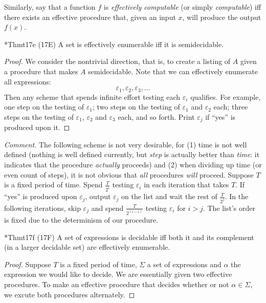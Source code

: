 Similarly, say that a function $f$ is \textit{effectively computable} (or simply \textit{computable}) iff there exists an effective procedure that, given an input $x$, will produce the output $f(x)$.

\begin{reference}{*Thm}{t17e}
  (17E) A set is effectively enumerable iff it is semidecidable.
\end{reference}

\begin{proof}
  We consider the nontrivial direction, that is, to create a listing of $A$ given a procedure that makes $A$ semidecidable. Note that we can effectively enumerate all expressions:
  \[
    \varepsilon_1,\varepsilon_2,\varepsilon_3,\dots
  \]
  Then any scheme that spends infinite effort testing each $\varepsilon_i$ qualifies. For example, one step on the testing of $\varepsilon_1$; two steps on the testing of $\varepsilon_1$ and $\varepsilon_2$ each; three steps on the testing of $\varepsilon_1$, $\varepsilon_2$ and $\varepsilon_3$ each, and so forth. Print $\varepsilon_j$ if ``yes'' is produced upon it.
\end{proof}

\textit{Comment.} The following scheme is not very desirable, for (1) time is not well defined (nothing is well defined currently, but \textit{step} is actually better than \textit{time}: it indicates that the procedure \textit{actually} proceeds) and (2) when dividing up time (or even count of steps), it is not obvious that \textit{all} procedures \textit{will} proceed. Suppose $T$ is a fixed period of time. Spend $\frac{T}{2^i}$ testing $\varepsilon_i$ in each iteration that takes $T$. If ``yes'' is produced upon $\varepsilon_j$, output $\varepsilon_j$ on the list and wait the rest of $\frac{T}{2^j}$. In the following iterations, skip $\varepsilon_j$ and spend $\frac{T}{2^{(i-1)}}$ testing $\varepsilon_i$ for $i>j$. The list's order is fixed due to the determinism of our procedure.

\begin{reference}{*Thm}{t17f}
  (17F) A set of expressions is decidable iff both it and its complement (in a larger decidable set) are effectively enumerable.
\end{reference}

\begin{proof}
  Suppose $T$ is a fixed period of time, $\Sigma$ a set of expressions and $\alpha$ the expression we would like to decide. We are essentially given two effective procedures. To make an effective procedure that decides whether or not $\alpha\in \Sigma$, we excute both procedures alternately.
\end{proof}

